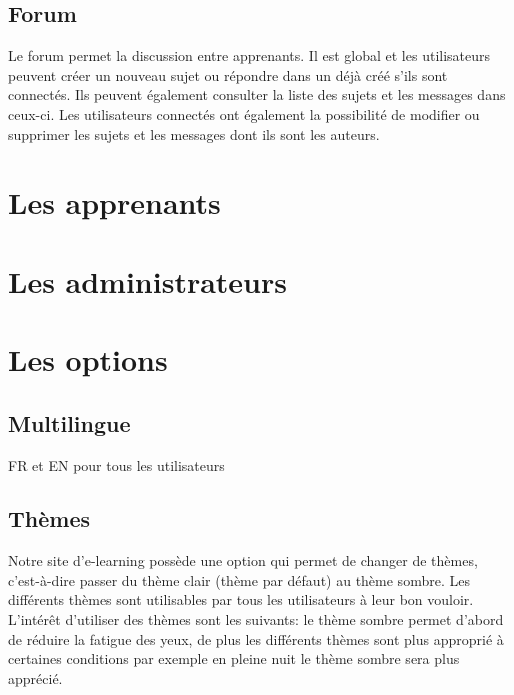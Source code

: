 \documentclass[a4paper,10pt]{article}
\begin{document}
\subsection{Forum}
Le forum permet la discussion entre apprenants. Il est global et les utilisateurs peuvent créer un nouveau sujet ou répondre dans un déjà créé s'ils sont connectés. Ils peuvent également consulter la liste des sujets et les messages dans ceux-ci. Les utilisateurs connectés ont également la possibilité de modifier ou supprimer les sujets et les messages dont ils sont les auteurs.

\section{Les apprenants}

\section{Les administrateurs}


\section{Les options}
\subsection{Multilingue}
FR et EN pour tous les utilisateurs 

\subsection{Thèmes}
Notre site d'e-learning possède une option qui permet de changer de thèmes, c'est-à-dire passer du thème clair (thème par défaut) au thème sombre. Les différents thèmes sont utilisables par tous les utilisateurs à leur bon vouloir. L'intérêt d'utiliser des thèmes sont les suivants: le thème sombre permet d’abord de réduire la fatigue des yeux, de plus les différents thèmes sont plus approprié à certaines conditions par exemple en pleine nuit le thème sombre sera plus apprécié.\\
\end{document}
